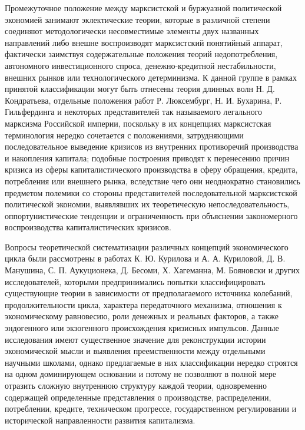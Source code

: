 Промежуточное положение между марксистской и буржуазной политической экономией занимают эклектические теории, которые в различной степени соединяют методологически несовместимые элементы двух названных направлений либо внешне воспроизводят марксистский понятийный аппарат, фактически заимствуя содержательные положения теорий недопотребления, автономного инвестиционного спроса, денежно-кредитной нестабильности, внешних рынков или технологического детерминизма. К данной группе в рамках принятой классификации могут быть отнесены теория длинных волн Н. Д. Кондратьева, отдельные положения работ Р. Люксембург, Н. И. Бухарина, Р. Гильфердинга и некоторых представителей так называемого легального марксизма Российской империи, поскольку в их концепциях марксистская терминология нередко сочетается с положениями, затрудняющими последовательное выведение кризисов из внутренних противоречий производства и накопления капитала; подобные построения приводят к перенесению причин кризиса из сферы капиталистического производства в сферу обращения, кредита, потребления или внешнего рынка, вследствие чего они неоднократно становились предметом полемики со стороны представителей последовательной марксистской политической экономии, выявлявших их теоретическую непоследовательность, оппортунистические тенденции и ограниченность при объяснении закономерного воспроизводства капиталистических кризисов.

Вопросы теоретической систематизации различных концепций экономического цикла были рассмотрены в работах К. Ю. Курилова и А. А. Куриловой, Д. В. Манушина, С. П. Аукуционека, Д. Бесоми, Х. Хагеманна, М. Бояновски и других исследователей, которыми предпринимались попытки классифицировать существующие теории в зависимости от предполагаемого источника колебаний, продолжительности цикла, характера передаточного механизма, отношения к экономическому равновесию, роли денежных и реальных факторов, а также эндогенного или экзогенного происхождения кризисных импульсов. Данные исследования имеют существенное значение для реконструкции истории экономической мысли и выявления преемственности между отдельными научными школами, однако предлагаемые в них классификации нередко строятся на одном доминирующем основании и потому не позволяют в полной мере отразить сложную внутреннюю структуру каждой теории, одновременно содержащей определенные представления о производстве, распределении, потреблении, кредите, техническом прогрессе, государственном регулировании и исторической направленности развития капитализма.

